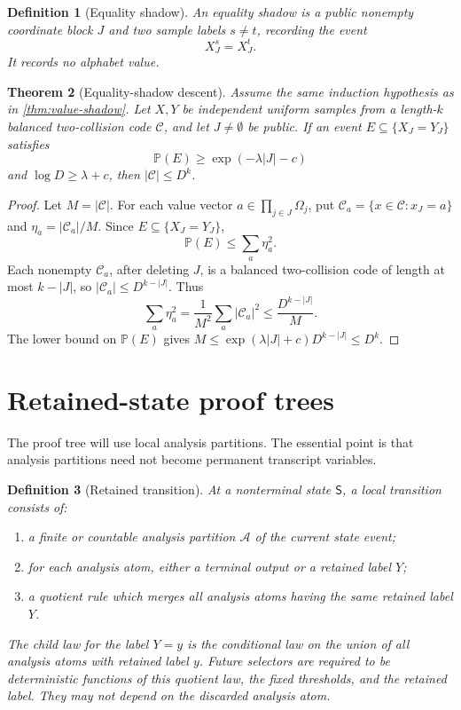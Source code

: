 \documentclass[11pt]{article}
\newcommand{\Cref}[1]{\ref{#1}}
\newtheorem{theorem}{Theorem}[section]
\newtheorem{definition}[theorem]{Definition}
\theoremstyle{remark}
\newcommand{\C}{\mathcal C}
\newcommand{\Prob}{\mathbb P}
\newcommand{\State}{\mathsf S}
\begin{document}
\begin{definition}[Equality shadow]
An equality shadow is a public nonempty coordinate block $J$ and two sample labels $s\ne t$, recording the event
\[
        X^s_J=X^t_J.
\]
It records no alphabet value.
\end{definition}

\begin{theorem}[Equality-shadow descent]\label{thm:equality-shadow}
Assume the same induction hypothesis as in \Cref{thm:value-shadow}.  Let $X,Y$ be independent uniform samples from a length-$k$ balanced two-collision code $\C$, and let $J\ne\emptyset$ be public.  If an event $E\subseteq\{X_J=Y_J\}$ satisfies
\[
        \Prob(E)\ge \exp(-\lambda |J|-c)
\]
and $\log D\ge \lambda+c$, then $|\C|\le D^k$.
\end{theorem}

\begin{proof}
Let $M=|\C|$.  For each value vector $a\in\prod_{j\in J}\Omega_j$, put $\C_a=\{x\in\C:x_J=a\}$ and $\eta_a=|\C_a|/M$.  Since $E\subseteq\{X_J=Y_J\}$,
\[
        \Prob(E)\le \sum_a \eta_a^2.
\]
Each nonempty $\C_a$, after deleting $J$, is a balanced two-collision code of length at most $k-|J|$, so $|\C_a|\le D^{k-|J|}$.  Thus
\[
        \sum_a\eta_a^2=\frac{1}{M^2}\sum_a|\C_a|^2
        \le \frac{D^{k-|J|}}{M}.
\]
The lower bound on $\Prob(E)$ gives $M\le \exp(\lambda |J|+c)D^{k-|J|}\le D^k$.
\end{proof}

\section{Retained-state proof trees}

The proof tree will use local analysis partitions.  The essential point is that analysis partitions need not become permanent transcript variables.

\begin{definition}[Retained transition]
At a nonterminal state $\State$, a local transition consists of:
\begin{enumerate}[label=\textup{(\roman*)}]
\item a finite or countable analysis partition $\mathcal A$ of the current state event;
\item for each analysis atom, either a terminal output or a retained label $Y$;
\item a quotient rule which merges all analysis atoms having the same retained label $Y$.
\end{enumerate}
The child law for the label $Y=y$ is the conditional law on the union of all analysis atoms with retained label $y$.  Future selectors are required to be deterministic functions of this quotient law, the fixed thresholds, and the retained label.  They may not depend on the discarded analysis atom.
\end{definition}
\end{document}
